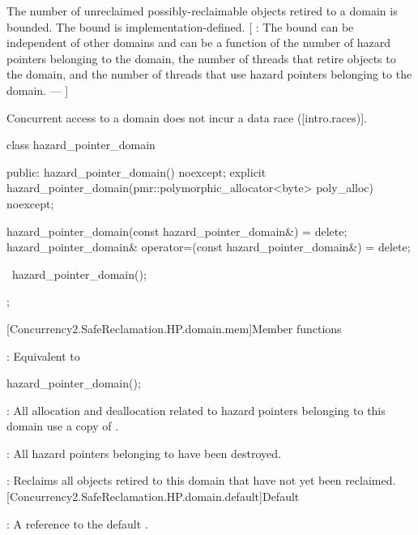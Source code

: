 \pnum
The number of unreclaimed possibly-reclaimable objects retired to a domain is bounded.
The bound is implementation-defined. [ : The bound can be independent of other
domains and can be a function of the number of hazard pointers belonging to the
domain, the number of threads that retire objects to the domain, and the number of
threads that use hazard pointers belonging to the domain. ---  ]

\pnum
Concurrent access to a domain does not incur a data race ([intro.races)].

\begin{codeblock}
class hazard_pointer_domain {
public:
  hazard_pointer_domain() noexcept;
  explicit hazard_pointer_domain(pmr::polymorphic_allocator<byte> poly_alloc) noexcept;

  hazard_pointer_domain(const hazard_pointer_domain&) = delete;
  hazard_pointer_domain& operator=(const hazard_pointer_domain&) = delete;

  ~hazard_pointer_domain();
};
\end{codeblock}

[Concurrency2.SafeReclamation.HP.domain.mem]{Member functions}


\pnum
{}: Equivalent to
\begin{codeblock}
hazard_pointer_domain({});
\end{codeblock}


\pnum
{}: All allocation and deallocation related to hazard pointers belonging to this
domain use a copy of .
\\


\pnum
{}: All hazard pointers belonging to  have been destroyed.

\pnum
{}: Reclaims all objects retired to this domain that have not yet been reclaimed.
\\

[Concurrency2.SafeReclamation.HP.domain.default]{Default }


\pnum
{}: A reference to the default .

